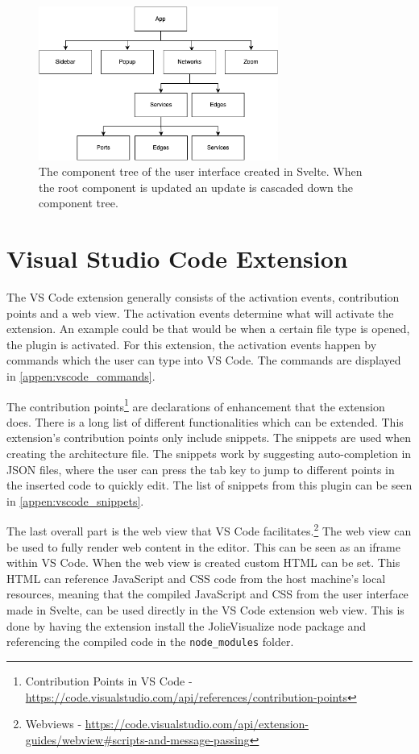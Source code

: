 \begin{figure}[t]
    \center
    \includegraphics[width=0.70\textwidth]{figures/component_tree.png}
    \caption{The component tree of the user interface created in Svelte. When the root component is updated an update is cascaded down the component tree.}
    \label{figure:component_tree}
\end{figure}

\section{Visual Studio Code Extension}
The VS Code extension generally consists of the activation events, contribution points and a web view.
The activation events determine what will activate the extension. An example could be that would be when a certain file type is opened, the plugin is activated.
For this extension, the activation events happen by commands which the user can type into VS Code. The commands are displayed in \cref{appen:vscode_commands}.

The contribution points\footnote{Contribution Points in VS Code - \url{https://code.visualstudio.com/api/references/contribution-points}} are declarations of enhancement that the extension does. There is a long list of different functionalities which can be extended.
This extension's contribution points only include snippets. The snippets are used when creating the architecture file. The snippets work by suggesting auto-completion in JSON files, where the user can press the tab key to jump to different points in the inserted code to quickly edit.
The list of snippets from this plugin can be seen in \cref{appen:vscode_snippets}.

The last overall part is the web view that VS Code facilitates.\footnote{Webviews - \url{https://code.visualstudio.com/api/extension-guides/webview\#scripts-and-message-passing}} The web view can be used to fully render web content in the editor.
This can be seen as an iframe within VS Code. When the web view is created custom HTML can be set. This HTML can reference JavaScript and CSS code from the host machine's local resources, meaning that the compiled JavaScript and CSS from the user interface made in Svelte, can be used directly in the VS Code extension web view.
This is done by having the extension install the JolieVisualize node package and referencing the compiled code in the \texttt{node\_modules} folder.

